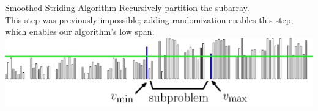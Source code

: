 \documentclass[table,serif,mathserif,final]{beamer}
\theoremstyle{remark}
\begin{document}
\begin{frame}{}
\begin{columns}[t]
\begin{column}{0.5\linewidth}
\begin{block}{\Huge Smoothed Striding Algorithm}
	Recursively partition the subarray.\\
  {\color{blue}This step was previously impossible; adding randomization enables this step, which enables our algorithm's low span. }
	\includegraphics[width=\linewidth]{imgs/smoothedStridingAlgSim/sim45.eps}
\end{block}

  \end{column}

\end{columns}
\end{frame}
\end{document}
